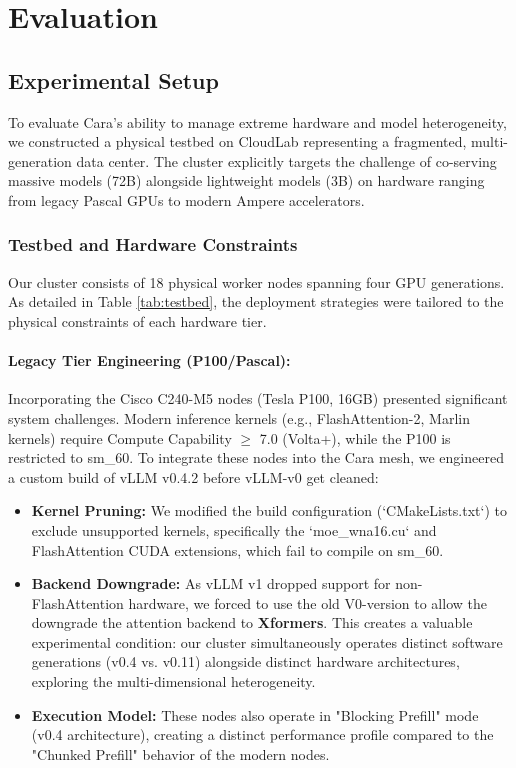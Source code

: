\documentclass[letterpaper, anonymous, twocolumn, 10pt]{article}
\begin{document}
\section{Evaluation} \label{section:evaluation}

\subsection{Experimental Setup} \label{section:evaluation_setup}

To evaluate Cara's ability to manage extreme hardware and model heterogeneity, we constructed a physical testbed on CloudLab \cite{cloudlab} representing a fragmented, multi-generation data center. The cluster explicitly targets the challenge of co-serving massive models (72B) alongside lightweight models (3B) on hardware ranging from legacy Pascal GPUs to modern Ampere accelerators.

\subsubsection{Testbed and Hardware Constraints}
Our cluster consists of 18 physical worker nodes spanning four GPU generations. As detailed in Table \ref{tab:testbed}, the deployment strategies were tailored to the physical constraints of each hardware tier.

\paragraph{Legacy Tier Engineering (P100/Pascal):}
Incorporating the Cisco C240-M5 nodes (Tesla P100, 16GB) presented significant system challenges. Modern inference kernels (e.g., FlashAttention-2, Marlin kernels) require Compute Capability $\ge$ 7.0 (Volta+), while the P100 is restricted to sm\_60. To integrate these nodes into the Cara mesh, we engineered a custom build of vLLM v0.4.2 before vLLM-v0 get cleaned:
\begin{itemize}
    \item \textbf{Kernel Pruning:} We modified the build configuration (`CMakeLists.txt`) to exclude unsupported kernels, specifically the `moe\_wna16.cu` and FlashAttention CUDA extensions, which fail to compile on sm\_60.
    \item \textbf{Backend Downgrade:} As vLLM v1 dropped support for non-FlashAttention hardware, we forced to use the old V0-version to allow the downgrade the attention backend to \textbf{Xformers}. This creates a valuable experimental condition: our cluster simultaneously operates distinct software generations (v0.4 vs. v0.11) alongside distinct hardware architectures, exploring the multi-dimensional heterogeneity.
    \item \textbf{Execution Model:} These nodes also operate in "Blocking Prefill" mode (v0.4 architecture), creating a distinct performance profile compared to the "Chunked Prefill" behavior of the modern nodes.
\end{itemize}
\end{document}
